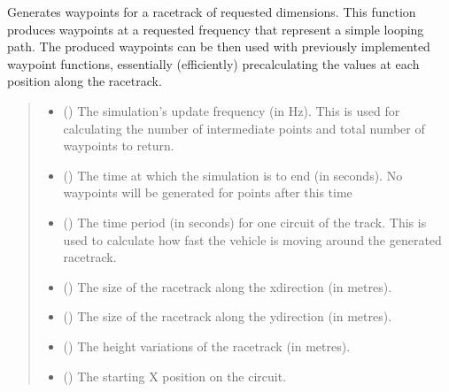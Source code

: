 \documentclass[letterpaper,10pt,english]{sphinxmanual}
\begin{document}
\begin{fulllineitems}
\sphinxAtStartPar
Generates waypoints for a racetrack of requested dimensions.
This function produces waypoints at a requested frequency that represent
a simple looping path. The produced waypoints can be then used with
previously implemented waypoint functions, essentially (efficiently)
pre\sphinxhyphen{}calculating the values at each position along the racetrack.
\begin{quote}\begin{description}
\begin{itemize}
\item {} 
\sphinxAtStartPar
{} () \textendash{} The simulation’s update frequency (in Hz). This is used
for calculating the number of intermediate points and total number of
waypoints to return.

\item {} 
\sphinxAtStartPar
{} () \textendash{} The time at which the simulation is to end (in seconds).
No waypoints will be generated for points after this time

\item {} 
\sphinxAtStartPar
{} () \textendash{} The time period (in seconds) for one circuit of the track.
This is used to calculate how fast the vehicle is moving around the
generated racetrack.

\item {} 
\sphinxAtStartPar
{} () \textendash{} The size of the racetrack along the x\sphinxhyphen{}direction (in metres).

\item {} 
\sphinxAtStartPar
{} () \textendash{} The size of the racetrack along the y\sphinxhyphen{}direction (in metres).

\item {} 
\sphinxAtStartPar
{} () \textendash{} The height variations of the racetrack (in metres).

\item {} 
\sphinxAtStartPar
{} () \textendash{} The starting X position on the circuit.


\end{itemize}
\end{description}
\end{quote}
\end{fulllineitems}
\end{document}
